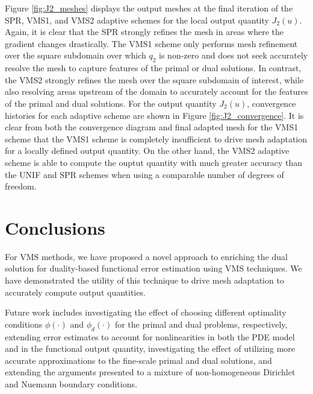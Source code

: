 Figure \ref{fig:J2_meshes} displays the output meshes at
the final iteration of the \textsc{SPR}, \textsc{VMS1},
and \textsc{VMS2} adaptive schemes for the local
output quantity $J_2(u)$. Again, it is clear that the
\textsc{SPR} strongly refines the mesh in areas where the
gradient changes drastically. The \textsc{VMS1} scheme
only performs mesh refinement over the square subdomain
over which $q_2$ is non-zero and does not seek
accurately resolve the mesh to capture features of
the primal or dual solutions. In contrast, the
\textsc{VMS2} strongly refines the mesh over the
square subdomain of interest, while also resolving
areas upstream of the domain to accurately account
for the features of the primal and dual solutions.
For the output quantity $J_2(u)$, convergence histories
for each adaptive scheme are shown in Figure
\ref{fig:J2_convergence}. It is clear from both
the convergence diagram and final adapted mesh
for the \textsc{VMS1} scheme that the \textsc{VMS1}
scheme is completely insufficient to drive mesh
adaptation for a locally defined output quantity.
On the other hand, the \textsc{VMS2} adaptive scheme
is able to compute the ouptut quantity with much
greater accuracy than the \textsc{UNIF} and
\textsc{SPR} schemes when using a comparable number
of degrees of freedom.

\section{Conclusions}

For VMS methods, we have proposed a novel approach
to enriching the dual solution for duality-based
functional error estimation using VMS techniques.
We have demonstrated the utility of this technique
to drive mesh adaptation to accurately compute
output quantities.

Future work includes investigating the effect
of choosing different optimality conditions
$\phi(\cdot)$ and $\phi_d(\cdot)$ for the primal
and dual problems, respectively, extending
error estimates to account for nonlinearities
in both the PDE model and in the functional output
quantity, investigating the effect of
utilizing more accurate approximations to the
fine-scale primal and dual solutions, and
extending the arguments presented to
a mixture of non-homogeneous Dirichlet
and Nuemann boundary conditions.
